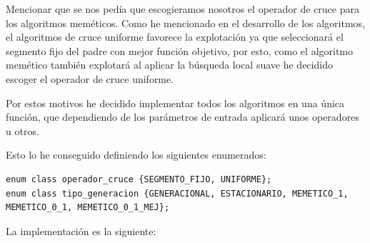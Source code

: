 \documentclass[12pt, spanish]{article}
\begin{document}
Mencionar que se nos pedía que escogieramos nosotros el operador de cruce para los algoritmos meméticos. Como he mencionado en el desarrollo de los algoritmos, el algoritmos de cruce uniforme favorece la explotación ya que seleccionará el segmento fijo del padre con mejor función objetivo, por esto, como el algoritmo memético también explotará al aplicar la búsqueda local suave he decidido escoger el operador de cruce uniforme.

Por estos motivos he decidido implementar todos los algoritmos en una única función, que dependiendo de los parámetros de entrada aplicará unos operadores u otros.

Esto lo he conseguido definiendo los siguientes enumerados:

\begin{lstlisting}
enum class operador_cruce {SEGMENTO_FIJO, UNIFORME};
enum class tipo_generacion {GENERACIONAL, ESTACIONARIO, MEMETICO_1, MEMETICO_0_1, MEMETICO_0_1_MEJ};
\end{lstlisting}

\newpage

La implementación es la siguiente:
\end{document}
